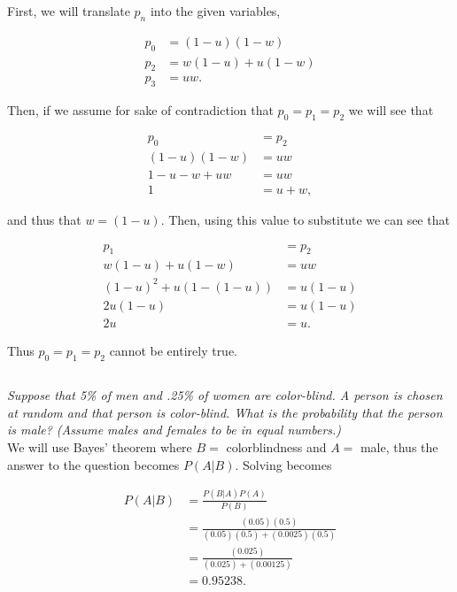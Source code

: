 \documentclass[12pt]{amsart}
\begin{document}
First, we will translate $p_n$ into the given variables,

\begin{align*}
	p_0 &= (1-u)(1-w) \\
	p_2 &= w(1-u)+u(1-w) \\
	p_3 &= uw.
\end{align*}

Then, if we assume for sake of contradiction that \(p_0 = p_1 = p_2\) we will see that

\begin{align*}
	p_0 &=  p_2\\
	(1-u)(1-w) &= uw \\
	1-u-w+uw &= uw \\
	1 &= u+w, 
\end{align*}

and thus that $w=(1-u)$. Then, using this value to substitute we can see that

\begin{align*}
	p_1 &=  p_2\\
	w(1-u)+u(1-w) &=uw \\
	(1-u)^2+u(1-(1-u)) &=u(1-u) \\
	2u(1-u) &= u(1-u) \\
	2u &= u.
\end{align*}

Thus \(p_0 = p_1 = p_2\) cannot be entirely true. \\[2em]


\setcounter{subsection}{32}
\subsection{} %
\textit{Suppose that 5\% of men and .25\% of women are color-blind. A person is chosen at random and that person is color-blind. 
	What is the probability that the person is male? (Assume males and females to be in equal numbers.)} \\

We will use Bayes' theorem where $B=$ colorblindness and $A=$ male, thus the answer to the question becomes $P(A|B)$.
Solving becomes

\begin{align*}
	P(A|B) &= \frac{P(B|A)P(A)}{P(B)} \\
	&= \frac{(0.05)(0.5)}{(0.05)(0.5)+(0.0025)(0.5)} \\
	&= \frac{(0.025)}{(0.025)+(0.00125)} \\
	&= 0.95238. \\
\end{align*} \\
\end{document}
